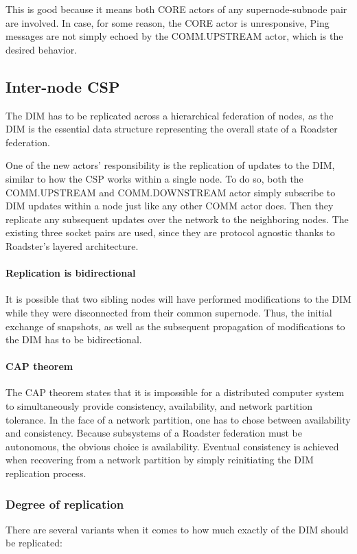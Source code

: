 This is good because it means both CORE actors of any supernode-subnode pair
are involved. In case, for some reason, the CORE actor is unresponsive, Ping
messages are not simply echoed by the COMM.UPSTREAM actor, which is the desired
behavior.


\clearpage
\subsection{Inter-node CSP}
The DIM has to be replicated across a hierarchical federation of nodes, as the
DIM is the essential data structure representing the overall state of a
Roadster federation.

One of the new actors' responsibility is the replication of updates to the DIM,
similar to how the \gls{CSP} works within a single node.  To do so, both the
COMM.UPSTREAM and COMM.DOWNSTREAM actor simply subscribe to DIM updates within
a node just like any other COMM actor does.  Then they replicate any subsequent
updates over the network to the neighboring nodes. The existing three socket
pairs are used, since they are protocol agnostic thanks to Roadster's layered
architecture.

\paragraph{Replication is bidirectional}
It is possible that two sibling nodes will have performed modifications to the
DIM while they were disconnected from their common supernode. Thus, the initial
exchange of snapshots, as well as the subsequent propagation of modifications
to the DIM has to be bidirectional.

\paragraph{CAP theorem}
The CAP theorem \cite{wp:cap} states that it is impossible for a distributed
computer system to simultaneously provide consistency, availability, and
network partition tolerance. In the face of a network partition, one has to
chose between availability and consistency. Because subsystems of a Roadster
federation must be autonomous, the obvious choice is availability. Eventual
consistency is achieved when recovering from a network partition by simply
reinitiating the DIM replication process.


\subsubsection{Degree of replication}
There are several variants when it comes to how much exactly of the DIM should be replicated:
